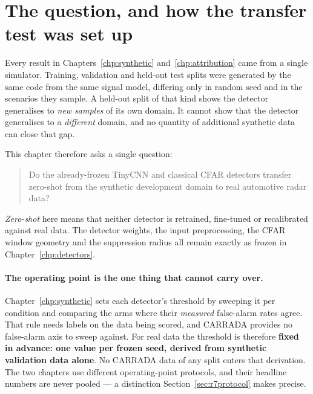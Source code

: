 
\section{The question, and how the transfer test was set up}
\label{sec:r7intro}

Every result in Chapters~\ref{chp:synthetic} and~\ref{chp:attribution} came from a single
simulator. Training, validation and held-out test splits were generated by the same code from the
same signal model, differing only in random seed and in the scenarios they sample. A held-out split
of that kind shows the detector generalises to \emph{new samples} of its own domain. It cannot show
that the detector generalises to a \emph{different} domain, and no quantity of additional synthetic
data can close that gap.

This chapter therefore asks a single question:

\begin{quote}
Do the already-frozen TinyCNN and classical CFAR detectors transfer zero-shot from the synthetic
development domain to real automotive radar data?
\end{quote}

\emph{Zero-shot} here means that neither detector is retrained, fine-tuned or recalibrated against
real data. The detector weights, the input preprocessing, the CFAR window geometry and the
suppression radius all remain exactly as frozen in Chapter~\ref{chp:detectors}.

\paragraph{The operating point is the one thing that cannot carry over.}
Chapter~\ref{chp:synthetic} sets each detector's threshold by sweeping it per condition and
comparing the arms where their \emph{measured} false-alarm rates agree. That rule needs labels on
the data being scored, and CARRADA provides no false-alarm axis to sweep against. For real data the
threshold is therefore \textbf{fixed in advance: one value per frozen seed, derived from synthetic
validation data alone}. No CARRADA data of any split enters that derivation. The two chapters use
different operating-point protocols, and their headline numbers are never pooled --- a distinction
Section~\ref{sec:r7protocol} makes precise.

